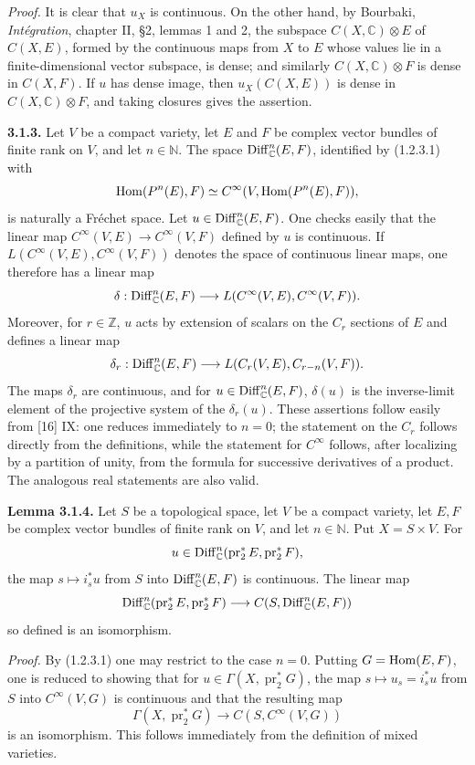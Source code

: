 \documentclass[11pt]{article}
\begin{document}
\emph{Proof.} It is clear that $u_X$ is continuous. On the other hand, by Bourbaki, \emph{Intégration}, chapter II, §2, lemmas 1 and 2, the subspace $C(X,\mathbb C)\otimes E$ of $C(X,E)$, formed by the continuous maps from $X$ to $E$ whose values lie in a finite-dimensional vector subspace, is dense; and similarly $C(X,\mathbb C)\otimes F$ is dense in $C(X,F)$. If $u$ has dense image, then $u_X(C(X,E))$ is dense in $C(X,\mathbb C)\otimes F$, and taking closures gives the assertion.

\textbf{3.1.3.} Let $V$ be a compact variety, let $E$ and $F$ be complex vector bundles of finite rank on $V$, and let $n\in\mathbb N$. The space $\operatorname{Diff}^n_{\mathbb C}(E,F)$, identified by (1.2.3.1) with
\[
 \operatorname{Hom}(P^n(E),F)\simeq C^\infty(V,\operatorname{Hom}(P^n(E),F)),
\]
is naturally a Fréchet space. Let $u\in\operatorname{Diff}^n_{\mathbb C}(E,F)$. One checks easily that the linear map $C^\infty(V,E)\to C^\infty(V,F)$ defined by $u$ is continuous. If $L(C^\infty(V,E),C^\infty(V,F))$ denotes the space of continuous linear maps, one therefore has a linear map
\[
 \delta:\operatorname{Diff}^n_{\mathbb C}(E,F)
 \longrightarrow L(C^\infty(V,E),C^\infty(V,F)).
\]
Moreover, for $r\in\mathbb Z$, $u$ acts by extension of scalars on the $C_r$ sections of $E$ and defines a linear map
\[
 \delta_r:\operatorname{Diff}^n_{\mathbb C}(E,F)
 \longrightarrow L(C_r(V,E),C_{r-n}(V,F)).
\]
The maps $\delta_r$ are continuous, and for $u\in\operatorname{Diff}^n_{\mathbb C}(E,F)$, $\delta(u)$ is the inverse-limit element of the projective system of the $\delta_r(u)$. These assertions follow easily from [16] IX: one reduces immediately to $n=0$; the statement on the $C_r$ follows directly from the definitions, while the statement for $C^\infty$ follows, after localizing by a partition of unity, from the formula for successive derivatives of a product. The analogous real statements are also valid.

\textbf{Lemma 3.1.4.} Let $S$ be a topological space, let $V$ be a compact variety, let $E,F$ be complex vector bundles of finite rank on $V$, and let $n\in\mathbb N$. Put $X=S\times V$. For
\[
 u\in\operatorname{Diff}^n_{\mathbb C}(\operatorname{pr}_2^*E,\operatorname{pr}_2^*F),
\]
the map $s\mapsto i_s^*u$ from $S$ into $\operatorname{Diff}^n_{\mathbb C}(E,F)$ is continuous. The linear map
\[
 \operatorname{Diff}^n_{\mathbb C}(\operatorname{pr}_2^*E,\operatorname{pr}_2^*F)
 \longrightarrow C(S,\operatorname{Diff}^n_{\mathbb C}(E,F))
\]
so defined is an isomorphism.

\emph{Proof.} By (1.2.3.1) one may restrict to the case $n=0$. Putting $G=\operatorname{Hom}(E,F)$, one is reduced to showing that for $u\in\Gamma(X,\operatorname{pr}_2^*G)$, the map $s\mapsto u_s=i_s^*u$ from $S$ into $C^\infty(V,G)$ is continuous and that the resulting map
\[
 \Gamma(X,\operatorname{pr}_2^*G)\longrightarrow C(S,C^\infty(V,G))
\]
is an isomorphism. This follows immediately from the definition of mixed varieties.
\end{document}
